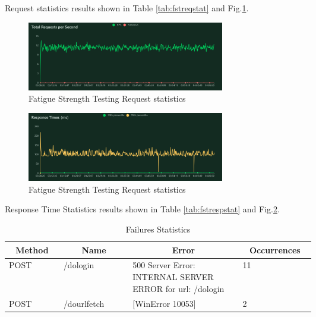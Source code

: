 \documentclass[journal]{IEEEtran}
\begin{document}
Request statistics results shown in Table \ref{tab:fstreqstat} and Fig.\ref{fig:fstreqstat}.

\begin{figure}[h]
  \centering
  \includegraphics[width=3.4in]{figures/fstreqstat.png}
  \caption{Fatigue Strength Testing Request statistics}
  \label{fig:fstreqstat}
  \end{figure}
\begin{figure}[h]
  \centering
  \includegraphics[width=3.4in]{figures/fstrespstat.png}
  \caption{Fatigue Strength Testing Request statistics}
  \label{fig:fstrespstat}
  \end{figure}

Response Time Statistics results shown in Table \ref{tab:fstrespstat} and Fig.\ref{fig:fstrespstat}.

\begin{table}[h]
\caption{Failures Statistics}
\label{tab:failureseva}
\begin{tabular}{|p{0.1\linewidth}|p{0.15\linewidth}|p{0.25\linewidth}|p{0.1\linewidth}|}
\hline
\multicolumn{1}{|c|}{\textbf{Method}} & \multicolumn{1}{c|}{\textbf{Name}} & \multicolumn{1}{c|}{\textbf{Error}}                       & \multicolumn{1}{c|}{\textbf{Occurrences}} \\ \hline
POST                                  & /dologin                           & 500 Server Error: INTERNAL SERVER ERROR for url: /dologin & 11                                        \\ \hline
POST                                  & /dourlfetch                        & {[}WinError 10053{]}                 & 2                                         \\ \hline
\end{tabular}
\end{table}
\end{document}
